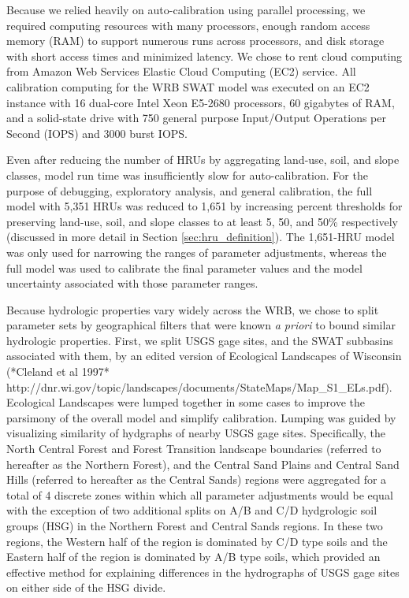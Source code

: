 Because we relied heavily on auto-calibration using parallel processing, we
required computing resources with many processors, enough random access
memory (RAM) to support numerous runs across processors, and disk storage with
short access times and minimized latency. We chose to rent cloud computing from Amazon Web Services
Elastic Cloud Computing (EC2) service. All calibration computing for the WRB
SWAT model was executed on an EC2 instance with 16 dual-core Intel Xeon
E5-2680 processors, 60 gigabytes of RAM, and a solid-state drive with 750
general purpose Input/Output Operations per Second (IOPS) and 3000 burst IOPS.

Even after reducing the number of HRUs by aggregating land-use, soil, and slope
classes, model run time was insufficiently slow for auto-calibration. For the
purpose of debugging, exploratory analysis, and general calibration, the full
model with 5,351 HRUs was reduced to 1,651 by increasing percent thresholds for
preserving land-use, soil, and slope classes to at least 5, 50, and 50\%
respectively (discussed in more detail in Section \ref{sec:hru_definition}). The
1,651-HRU model was only used for narrowing the ranges of parameter adjustments,
whereas the full model was used to calibrate the final parameter values and
the model uncertainty associated with those parameter ranges.

Because hydrologic properties vary widely across the WRB, we chose to split
parameter sets by geographical filters that were known \textit{a priori} to
bound similar hydrologic properties. First, we split USGS gage sites, and the
SWAT subbasins associated with them, by an edited version of Ecological
Landscapes of Wisconsin (*Cleland et al 1997*
http://dnr.wi.gov/topic/landscapes/documents/StateMaps/Map_S1_ELs.pdf).
Ecological Landscapes were lumped together in some cases to improve the
parsimony of the overall model and simplify calibration. Lumping was guided by
visualizing similarity of hydgraphs of nearby USGS gage sites. Specifically, the North
Central Forest and Forest Transition landscape boundaries (referred to
hereafter as the Northern Forest), and the Central Sand Plains and Central Sand
Hills (referred to hereafter as the Central Sands) regions were aggregated
for a total of 4 discrete zones within which all parameter adjustments would be
equal with the exception of two additional splits on A/B and C/D hydgrologic
soil groups (HSG) in the Northern Forest and Central Sands regions. In these two
regions, the Western half of the region is dominated by C/D type soils and the
Eastern half of the region is dominated by A/B type soils, which provided an
effective method for explaining differences in the hydrographs of USGS gage
sites on either side of the HSG divide.

